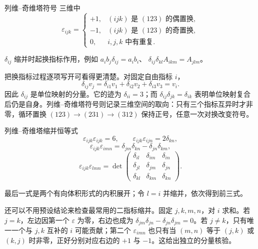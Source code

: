\begin{advdefinition}{列维--奇维塔符号}\label{advA3:def:levi-civita}
三维中
\[
 \varepsilon_{ijk}=\begin{cases}
 +1,&(ijk)\text{ 是 }(123)\text{ 的偶置换},\\
 -1,&(ijk)\text{ 是 }(123)\text{ 的奇置换},\\
 0,&i,j,k\text{ 中有重复}.
 \end{cases}
\]
\end{advdefinition}
$\delta_{ij}$ 缩并时起换指标作用，例如
$a_ib_j\delta_{ij}=a_ib_i$、
$\delta_{ij}\delta_{kl}A_{ikm}=A_{jlm}$。

把换指标过程逐项写开可看得更清楚。对固定自由指标 $i$，
\[
 \delta_{ij}v_j=\delta_{i1}v_1+\delta_{i2}v_2+\delta_{i3}v_3=v_i.
\]
因此 $\delta_{ij}$ 是单位映射的分量。它的迹为
$\delta_{ii}=3$；而 $\delta_{ij}\delta_{jk}=\delta_{ik}$ 表明单位映射复合后仍是自身。列维--奇维塔符号则记录三维空间的取向：只有三个指标互异时才非零，循环置换 $(123)\to(231)\to(312)$ 保持正号，任意一次对换改变符号。

\begin{advtheorem}{列维--奇维塔缩并恒等式}\label{advA3:thm:epsilon-identities}
\[
 \varepsilon_{ijk}\varepsilon_{ijk}=6,
 \qquad
 \varepsilon_{ijk}\varepsilon_{ijn}=2\delta_{kn},
\]
\[
 \boxed{\varepsilon_{ijk}\varepsilon_{imn}
 =\delta_{jm}\delta_{kn}-\delta_{jn}\delta_{km}},
\]
\[
 \varepsilon_{ijk}\varepsilon_{lmn}
 =\det\!\begin{pmatrix}
 \delta_{il}&\delta_{im}&\delta_{in}\\
 \delta_{jl}&\delta_{jm}&\delta_{jn}\\
 \delta_{kl}&\delta_{km}&\delta_{kn}
 \end{pmatrix}.
\]
\end{advtheorem}
最后一式是两个有向体积形式的内积展开；令 $l=i$ 并缩并，依次得到前三式。

还可以不用预设结论来检查最常用的二指标缩并。固定 $j,k,m,n$，对 $i$ 求和。若 $j=k$，左边因第一个 $\varepsilon$ 为零，右边也成为
$\delta_{jm}\delta_{jn}-\delta_{jn}\delta_{jm}=0$。若 $j\ne k$，只有唯一一个与 $j,k$ 互补的 $i$ 可能贡献；第二个 $\varepsilon_{imn}$ 也只有当 $(m,n)$ 等于 $(j,k)$ 或 $(k,j)$ 时非零，正好分别对应右边的 $+1$ 与 $-1$。这给出独立的分量核验。

